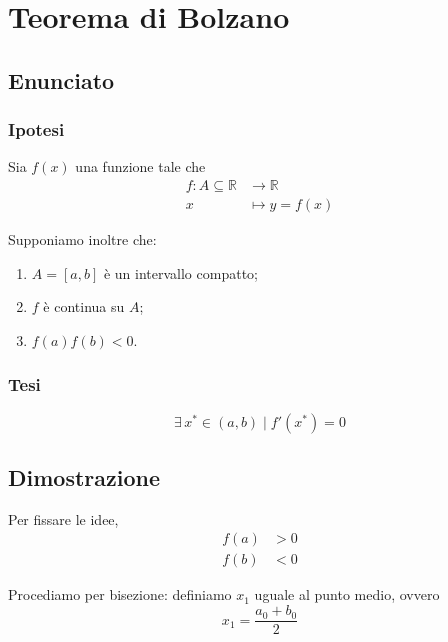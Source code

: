 \documentclass[../../dimostrazioni]{subfiles}
\begin{document}
    \chapter{Teorema di Bolzano}
    \label{teoBolzano}

        \section*{Enunciato}

            \subsection*{Ipotesi}

                Sia \(f(x)\) una funzione tale che
                \begin{align*}
                    f : A \subseteq \mathbb{R} &\longrightarrow \mathbb{R}\\
                    x &\longmapsto y = f(x) 
                \end{align*}

                Supponiamo inoltre che:

                \begin{enumerate}
                    \indentitem \item \(A = [a, b]\) è un intervallo compatto;
                    \indentitem \item \(f\) è continua su \(A\);
                    \indentitem \item \(f(a) f(b) < 0\).
                \end{enumerate}

            \subsection*{Tesi}
            
                \[\exists \, x^* \in (a,b) \; | \; f'(x^*) = 0 \]

        \section*{Dimostrazione}

            Per fissare le idee,
            \begin{align*}
                f(a) &> 0\\
                f(b) &< 0
            \end{align*}

            Procediamo per bisezione: definiamo \(x_1\) uguale al punto medio, ovvero
            \[
                x_1 = \frac{a_0 + b_0}{2}
            \]
\end{document}
